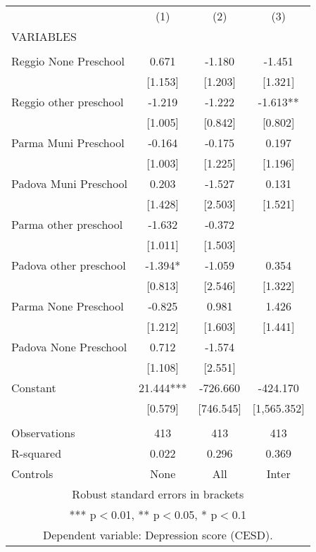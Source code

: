 \begin{tabular}{lccc} \hline
 & (1) & (2) & (3) \\
VARIABLES &  &  &  \\ \hline
 &  &  &  \\
Reggio None Preschool & 0.671 & -1.180 & -1.451 \\
 & [1.153] & [1.203] & [1.321] \\
Reggio other preschool & -1.219 & -1.222 & -1.613** \\
 & [1.005] & [0.842] & [0.802] \\
Parma Muni Preschool & -0.164 & -0.175 & 0.197 \\
 & [1.003] & [1.225] & [1.196] \\
Padova Muni Preschool & 0.203 & -1.527 & 0.131 \\
 & [1.428] & [2.503] & [1.521] \\
Parma other preschool & -1.632 & -0.372 &  \\
 & [1.011] & [1.503] &  \\
Padova other preschool & -1.394* & -1.059 & 0.354 \\
 & [0.813] & [2.546] & [1.322] \\
Parma None Preschool & -0.825 & 0.981 & 1.426 \\
 & [1.212] & [1.603] & [1.441] \\
Padova None Preschool & 0.712 & -1.574 &  \\
 & [1.108] & [2.551] &  \\
Constant & 21.444*** & -726.660 & -424.170 \\
 & [0.579] & [746.545] & [1,565.352] \\
 &  &  &  \\
Observations & 413 & 413 & 413 \\
R-squared & 0.022 & 0.296 & 0.369 \\
 Controls & None & All & Inter \\ \hline
\multicolumn{4}{c}{ Robust standard errors in brackets} \\
\multicolumn{4}{c}{ *** p$<$0.01, ** p$<$0.05, * p$<$0.1} \\
\multicolumn{4}{c}{ Dependent variable: Depression score (CESD).} \\
\end{tabular}

